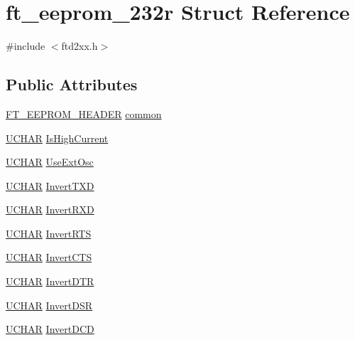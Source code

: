 \hypertarget{structft__eeprom__232r}{
\section{ft\_\-eeprom\_\-232r Struct Reference}
\label{structft__eeprom__232r}
}


{\ttfamily \#include $<$ftd2xx.h$>$}\subsection*{Public Attributes}
\begin{DoxyCompactItemize}
\item 
\hyperlink{structft__eeprom__header}{FT\_\-EEPROM\_\-HEADER} \hyperlink{structft__eeprom__232r_a04ed9a15b88229df4567d6c9ccd6c99d}{common}
\item 
\hyperlink{LALUsbx64_2include_2WinTypes_8h_a4f4bb67531a9bf6f0b9c6ad76aeba587}{UCHAR} \hyperlink{structft__eeprom__232r_abd8a4afecd3fa431c7654d14886395dd}{IsHighCurrent}
\item 
\hyperlink{LALUsbx64_2include_2WinTypes_8h_a4f4bb67531a9bf6f0b9c6ad76aeba587}{UCHAR} \hyperlink{structft__eeprom__232r_af430c36e3ca675a6860463b70b963369}{UseExtOsc}
\item 
\hyperlink{LALUsbx64_2include_2WinTypes_8h_a4f4bb67531a9bf6f0b9c6ad76aeba587}{UCHAR} \hyperlink{structft__eeprom__232r_ae284d5a2e53c8e77dcbdd7789734b8f0}{InvertTXD}
\item 
\hyperlink{LALUsbx64_2include_2WinTypes_8h_a4f4bb67531a9bf6f0b9c6ad76aeba587}{UCHAR} \hyperlink{structft__eeprom__232r_afbb26654eac5fa6266726e42f26ed317}{InvertRXD}
\item 
\hyperlink{LALUsbx64_2include_2WinTypes_8h_a4f4bb67531a9bf6f0b9c6ad76aeba587}{UCHAR} \hyperlink{structft__eeprom__232r_accb739bb2d2c81f31cb9e7e634d15e7c}{InvertRTS}
\item 
\hyperlink{LALUsbx64_2include_2WinTypes_8h_a4f4bb67531a9bf6f0b9c6ad76aeba587}{UCHAR} \hyperlink{structft__eeprom__232r_a95c9b6e2547151c62c36a981e3d121e6}{InvertCTS}
\item 
\hyperlink{LALUsbx64_2include_2WinTypes_8h_a4f4bb67531a9bf6f0b9c6ad76aeba587}{UCHAR} \hyperlink{structft__eeprom__232r_a782d2b0ecc30bae4b3f967fc349f6808}{InvertDTR}
\item 
\hyperlink{LALUsbx64_2include_2WinTypes_8h_a4f4bb67531a9bf6f0b9c6ad76aeba587}{UCHAR} \hyperlink{structft__eeprom__232r_af9f2706ecbe6182d52bce8d237cc9162}{InvertDSR}
\item 
\hyperlink{LALUsbx64_2include_2WinTypes_8h_a4f4bb67531a9bf6f0b9c6ad76aeba587}{UCHAR} \hyperlink{structft__eeprom__232r_a5ed1bcd1082728d070876c21c167743e}{InvertDCD}

\end{DoxyCompactItemize}
